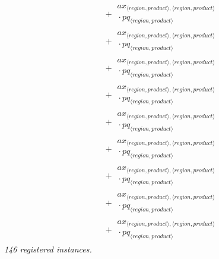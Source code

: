 \documentclass[11pt]{article}
\begin{document}
\begin{align*}
&\quad {}+ \begin{aligned}
ax_{\langle region, product\rangle,\langle region, product\rangle}\\
{}\cdot pq_{\langle region, product\rangle}
\end{aligned}\\
&\quad {}+ \begin{aligned}
ax_{\langle region, product\rangle,\langle region, product\rangle}\\
{}\cdot pq_{\langle region, product\rangle}
\end{aligned}\\
&\quad {}+ \begin{aligned}
ax_{\langle region, product\rangle,\langle region, product\rangle}\\
{}\cdot pq_{\langle region, product\rangle}
\end{aligned}\\
&\quad {}+ \begin{aligned}
ax_{\langle region, product\rangle,\langle region, product\rangle}\\
{}\cdot pq_{\langle region, product\rangle}
\end{aligned}\\
&\quad {}+ \begin{aligned}
ax_{\langle region, product\rangle,\langle region, product\rangle}\\
{}\cdot pq_{\langle region, product\rangle}
\end{aligned}\\
&\quad {}+ \begin{aligned}
ax_{\langle region, product\rangle,\langle region, product\rangle}\\
{}\cdot pq_{\langle region, product\rangle}
\end{aligned}\\
&\quad {}+ \begin{aligned}
ax_{\langle region, product\rangle,\langle region, product\rangle}\\
{}\cdot pq_{\langle region, product\rangle}
\end{aligned}\\
&\quad {}+ \begin{aligned}
ax_{\langle region, product\rangle,\langle region, product\rangle}\\
{}\cdot pq_{\langle region, product\rangle}
\end{aligned}\\
&\quad {}+ \begin{aligned}
ax_{\langle region, product\rangle,\langle region, product\rangle}\\
{}\cdot pq_{\langle region, product\rangle}
\end{aligned}
\end{align*}
\noindent\emph{146 registered instances.}\par
\end{document}
